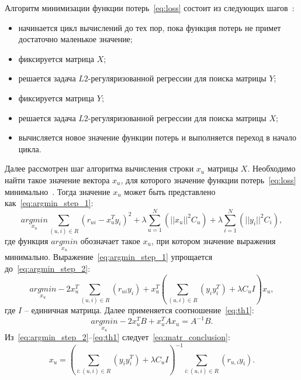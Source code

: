 Алгоритм минимизации функции потерь~\eqref{eq:loss} состоит из следующих шагов~\cite{yandex_matrix}:
\begin{itemize}
    \item начинается цикл вычислений до тех пор, пока функция потерь не примет достаточно маленькое значение;
    \item фиксируется матрица $X$;
    \item решается задача $L2$-регуляризованной регрессии для поиска матрицы $Y$;
    \item фиксируется матрица $Y$;
    \item решается задача $L2$-регуляризованной регрессии для поиска матрицы $X$;
    \item вычисляется новое значение функции потерь и выполняется переход в начало цикла.
\end{itemize}

Далее рассмотрен шаг алгоритма вычисления строки $x_u$ матрицы $X$.
Необходимо найти такое значение вектора $x_u$, для которого значение функции потерь~\eqref{eq:loss} минимально~\cite{yandex_matrix}.
Тогда значение $x_u$ может быть представлено как~\eqref{eq:argmin_step_1}:
\begin{equation}
    \underset{x_u}{argmin} \sum_{(u, i) \in R}{(r_{ui} - x_u^Ty_i)^2} + \lambda \sum_{u = 1}^{N}{(||x_u||^2C_u)} + \lambda \sum_{i = 1}^{N}{(||y_i||^2C_i)},
    \label{eq:argmin_step_1}
\end{equation}
где функция $\underset{x_u}{argmin}$ обозначает такое $x_u$, при котором значение выражения минимально.
Выражение~\eqref{eq:argmin_step_1} упрощается до~\eqref{eq:argmin_step_2}:
\begin{equation}
    \underset{x_u}{argmin} -2x_u^T\sum_{(u, i) \in R}{(r_{ui}y_i)} + x_u^T(\sum_{(u, i) \in R}{(y_iy_i^T) + \lambda C_uI})x_u,
    \label{eq:argmin_step_2}
\end{equation}
где $I$ -- единичная матрица.
Далее применяется соотношение~\eqref{eq:th1}:
\begin{equation}
    \underset{x_u}{argmin} -2x_u^TB + x_u^TAx_u = A^{-1}B.
    \label{eq:th1}
\end{equation}
Из~\eqref{eq:argmin_step_2}--\eqref{eq:th1} следует~\eqref{eq:matr_conclusion}:
\begin{equation}
\label{eq:matr_conclusion}
    x_u = (\sum_{i: (u, i) \in R}{(y_iy_i^T)}+ \lambda C_uI)^{-1}\sum_{i: (u, i) \in R}{(r_{u,i}y_i)}.
\end{equation}

